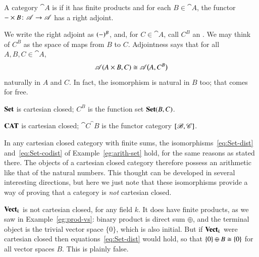 \begin{defn}
A category $\cat{A}$ is  if it has finite products
and for each $B \in \cat{A}$, the functor $\dashbk \times B\from \cat{A}
\to \cat{A}$ has a right adjoint.
\end{defn}
%
We write the right adjoint as $(-)^B$,%
%
%
and, for $C \in \cat{A}$, call
$C^B$ an .%
%
%
We may think of $C^B$ as the space of maps from $B$ to $C$.  Adjointness
says that for all $A, B, C \in \cat{A}$,
\[
\mathscr{A}(A \times B, C)
\cong
\mathscr{A}\bigl(A, C^B\bigr)
\]
naturally in $A$ and $C$.  In fact, the isomorphism is natural in $B$ too;
that comes for free.

\begin{example}
$\mathbf{Set}$ is cartesian closed; $C^B$ is the function%
%
%
%
set $\mathbf{Set}(B, C)$.
\end{example}

\begin{example}
\hspace*{-.5pt}%
$\mathbf{CAT}$ is cartesian closed; $\cat{C}^\cat{B}$ is the functor%
%
%
category $[\mathscr{B},\mathscr{C}]$.
\end{example}

In any cartesian closed category with finite sums, the
isomorphisms~\eqref{eq:Set-dist} and~\eqref{eq:Set-codist} of
Example~\ref{eg:arith-set} hold, for the same reasons as stated there.  The
objects of a cartesian closed category therefore possess an arithmetic%
%
%
like that of the natural numbers.  This thought can be developed in several
interesting directions, but here we just note that these isomorphisms
provide a way of proving that a category is \emph{not} cartesian closed.

\begin{example}
$\mathbf{Vect}_k$%
%
%
is not cartesian closed, for any field $k$.  It does have finite products,
as we saw in Example~\ref{eg:prod-vs}: binary product is direct sum
$\oplus$, and the terminal object is the trivial vector space $\{0\}$,
which is also initial.  But if $\mathbf{Vect}_k$ were cartesian closed then
equations~\eqref{eq:Set-dist} would hold, so that $\{0\} \oplus B \cong
\{0\}$ for all vector spaces $B$.  This is plainly false.
\end{example}

